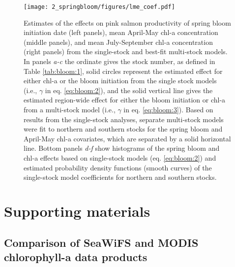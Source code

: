 \begin{figure}[htbp]
  \centering \texttt{[image: 2\_springbloom/figures/lme\_coef.pdf]}
  \caption[Estimates of the effects on salmon productivity of spring
    bloom initiation date and chl-a concentrations.]{Estimates of the effects on
    pink salmon productivity of spring bloom initiation date (left panels), mean
    April-May chl-a concentration (middle panels), and mean July-September chl-a
    concentration (right panels) from the single-stock and best-fit multi-stock
    models. In panels \emph{a-c} the ordinate gives the stock number, as defined
    in Table \ref{tab:bloom:1}, solid circles represent the estimated effect for
    either chl-a or the bloom initiation from the single stock models (i.e.,
    \(\gamma\) in eq.  \ref{eq:bloom:2}), and the solid vertical line gives the
    estimated region-wide effect for either the bloom initiation or chl-a from a
    multi-stock model (i.e., \(\gamma\) in eq.  \ref{eq:bloom:3}). Based on
    results from the single-stock analyses, separate multi-stock models were fit
    to northern and southern stocks for the spring bloom and April-May chl-a
    covariates, which are separated by a solid horizontal line. Bottom panels
    \emph{d-f} show histograms of the spring bloom and chl-a effects based on
    single-stock models (eq. \ref{eq:bloom:2}) and estimated probability density
    functions (smooth curves) of the single-stock model coefficients for
    northern and southern stocks.}
  \label{fig:bloom:6}
\end{figure}


\newpage
\section{Supporting materials}

\subsection{Comparison of SeaWiFS and MODIS chlorophyll-a data products}
\label{supp:bloom:A}


